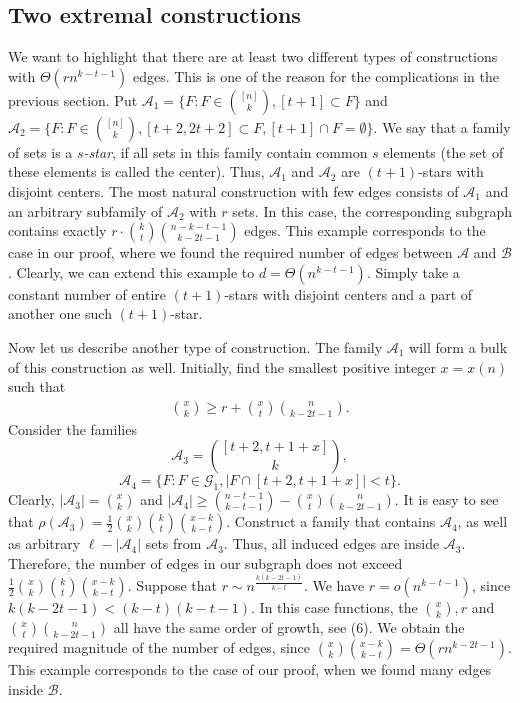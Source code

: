 \documentclass[12pt,a4paper]{article}
\newcommand{\cG}{\mathcal{G}}
\newcommand{\cA}{\mathcal{A}}
\newcommand{\bb}{\mathcal{B}}
\begin{document}
\subsection{Two extremal constructions}\label{sec42}
We want to highlight that there are at least two different types of constructions with $\Theta (rn^{k-t-1})$ edges. This is one of the reason for the complications in the previous section. Put $\cA_1 = \{F : F \in \binom{[n]}{k}, [t+1] \subset F \}$ and $\cA_2 = \{F : F \in \binom{[n]}{k}, [t+2,2t+2] \subset F, [t+1] \cap F = \emptyset \}$. We say that a family of sets is a \textit{$s$-star}, if all sets in this family contain common $s$ elements (the set of these elements is called the center). Thus, $\cA_1$ and $\cA_2$ are $(t+1)$-stars with disjoint centers. The most natural construction with few edges consists of $\cA_1$ and an arbitrary subfamily of $\cA_2$ with $r$ sets. In this case, the corresponding subgraph contains exactly $r \cdot \binom{k}{t}\binom{n-k-t-1}{k-2t-1}$ edges. This example corresponds to the case in our proof, where we found the required number of edges between $\cA$ and $\bb$. Clearly, we can extend this example to $d=\Theta(n^{k-t-1})$. Simply take a constant number of entire $(t+1)$-stars with disjoint centers and a part of another one such $(t+1)$-star.

Now let us describe another type of construction. The family $\cA_1$ will form a bulk of this construction as well. Initially, find the smallest positive integer $x=x(n)$ such that 
\begin{align}
    \binom{x}{k} \geqslant r + \binom{x}{t}\binom{n}{k-2t-1}.    
\end{align}
Consider the families 
$$\cA_3= \binom{[t+2,t+1+x]}{k},$$ $$\cA_4=\{F : F \in \cG_1, |F \cap [t+2,t+1+x]| < t \}.$$
Clearly, $|\cA_3|=\binom{x}{k}$ and $|\cA_4| \geqslant \binom{n-t-1}{k-t-1} - \binom{x}{t}\binom{n}{k-2t-1}$. It is easy to see that $\rho(\cA_3) = \frac{1}{2} \binom{x}{k} \binom{k}{t} \binom{x-k}{k-t}$. Construct a family that contains $\cA_4$, as well as arbitrary $\ell-|\cA_4|$ sets from $\cA_3$. Thus, all induced edges are inside $\cA_3$. Therefore, the number of edges in our subgraph does not exceed $\frac{1}{2} \binom{x}{k} \binom{k}{t} \binom{x-k}{k-t}$. Suppose that $r \sim n^{\frac{k(k-2t-1)}{k-t}}$. We have $r=o(n^{k-t-1})$, since $k(k-2t-1) < (k-t)(k-t-1)$. In this case functions, the $\binom{x}{k}, r$ and $\binom{x}{t}\binom{n}{k-2t-1}$ all have the same order of growth, see (6). We obtain the required magnitude of the number of edges, since $ \binom{x}{k} \binom{x-k}{k-t} = \Theta(rn^{k-2t-1})$. This example corresponds to the case of our proof, when we found many edges inside $\bb$.
\end{document}
